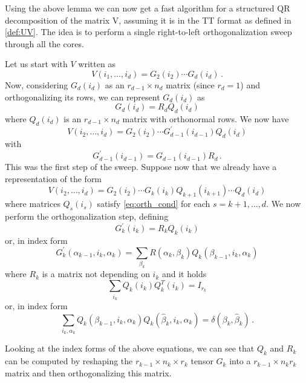 Using the above lemma we can now get a fast algorithm for a structured QR decomposition of the matrix V, assuming it is in the TT format as defined in \eqref{def:UV}. The idea is to perform a single right-to-left orthogonalization sweep through all the cores.

Let us start with $V$ written as
\begin{equation*}
  V(i_1,\ldots,i_d) = G_2(i_2) \cdots G_d(i_d)\, .
\end{equation*}
Now, considering $G_d(i_d)$ as an $r_{d-1} \times n_d$ matrix (since $r_d = 1$) and orthogonalizing its rows, we can represent $G_d(i_d)$ as
\begin{equation*}
  G_d(i_d) = R_d Q_d(i_d)
\end{equation*}
where $Q_d(i_d)$ is an $r_{d-1} \times n_d$ matrix with orthonormal rows.
We now have
\begin{equation*}
  V(i_2,\ldots,i_d) = G_2(i_2) \cdots G^\prime_{d-1}(i_{d-1}) Q_d(i_d)
\end{equation*}
with
\begin{equation*}
  G^\prime_{d-1}(i_{d-1}) = G_{d-1}(i_{d-1}) R_d\, .
\end{equation*}
This was the first step of the sweep. Suppose now that we already have a representation of the form
\begin{equation*}
  V(i_2,\ldots,i_d) = G_2(i_2) \cdots G_k(i_k) Q_{k+1}(i_{k+1}) \cdots Q_d(i_d)
\end{equation*}
where matrices $Q_s(i_s)$ satisfy \eqref{eq:orth_cond} for each $s = k+1, \ldots, d$. We now perform the orthogonalization step, defining
\begin{equation*}
  G^\prime_k(i_k) = R_k Q_k(i_k)
\end{equation*}
or, in index form
\begin{equation*}
  G^\prime_k (\alpha_{k-1},i_k,\alpha_k) = \sum_{\beta_k} R(\alpha_k,\beta_k) Q_k(\beta_{k-1},i_k,\alpha_k)
\end{equation*}
where $R_k$ is a matrix not depending on $i_k$ and it holds
\begin{equation*}
  \sum_{i_k} Q_k(i_k) Q_k^T(i_k) = I_{r_k}
\end{equation*}
or, in index form
\begin{equation*}
  \sum_{i_k,\alpha_k} Q_k(\beta_{k-1},i_k,\alpha_k)Q_k(\hat{\beta}_k,i_k,\alpha_k) = \delta(\beta_k,\hat{\beta}_k)\, .
\end{equation*}

Looking at the index forms of the above equations, we can see that $Q_k$ and $R_k$ can be computed by reshaping the $r_{k-1} \times n_k \times r_k$ tensor $G_k$ into a $r_{k-1} \times n_k r_k$ matrix and then orthogonalizing this matrix.

